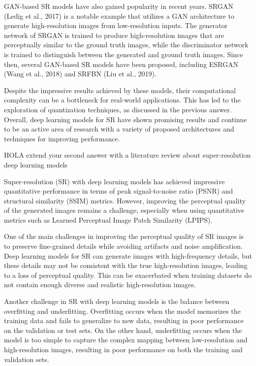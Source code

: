 GAN-based SR models have also gained popularity in recent years. SRGAN (Ledig et al., 2017) is a notable example that utilizes a GAN architecture to generate high-resolution images from low-resolution inputs. The generator network of SRGAN is trained to produce high-resolution images that are perceptually similar to the ground truth images, while the discriminator network is trained to distinguish between the generated and ground truth images. Since then, several GAN-based SR models have been proposed, including ESRGAN (Wang et al., 2018) and SRFBN (Liu et al., 2019).

Despite the impressive results achieved by these models, their computational complexity can be a bottleneck for real-world applications. This has led to the exploration of quantization techniques, as discussed in the previous answer. Overall, deep learning models for SR have shown promising results and continue to be an active area of research with a variety of proposed architectures and techniques for improving performance.

HOLA extend your second answer with a literature review about super-resolution deep learning models

Super-resolution (SR) with deep learning models has achieved impressive quantitative performance in terms of peak signal-to-noise ratio (PSNR) and structural similarity (SSIM) metrics. However, improving the perceptual quality of the generated images remains a challenge, especially when using quantitative metrics such as Learned Perceptual Image Patch Similarity (LPIPS).

One of the main challenges in improving the perceptual quality of SR images is to preserve fine-grained details while avoiding artifacts and noise amplification. Deep learning models for SR can generate images with high-frequency details, but these details may not be consistent with the true high-resolution images, leading to a loss of perceptual quality. This can be exacerbated when training datasets do not contain enough diverse and realistic high-resolution images.

Another challenge in SR with deep learning models is the balance between overfitting and underfitting. Overfitting occurs when the model memorizes the training data and fails to generalize to new data, resulting in poor performance on the validation or test sets. On the other hand, underfitting occurs when the model is too simple to capture the complex mapping between low-resolution and high-resolution images, resulting in poor performance on both the training and validation sets.

